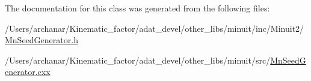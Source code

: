 The documentation for this class was generated from the following files\+:\begin{DoxyCompactItemize}
\item 
/\+Users/archanar/\+Kinematic\+\_\+factor/adat\+\_\+devel/other\+\_\+libs/minuit/inc/\+Minuit2/\mbox{\hyperlink{other__libs_2minuit_2inc_2Minuit2_2MnSeedGenerator_8h}{Mn\+Seed\+Generator.\+h}}\item 
/\+Users/archanar/\+Kinematic\+\_\+factor/adat\+\_\+devel/other\+\_\+libs/minuit/src/\mbox{\hyperlink{MnSeedGenerator_8cxx}{Mn\+Seed\+Generator.\+cxx}}\end{DoxyCompactItemize}

